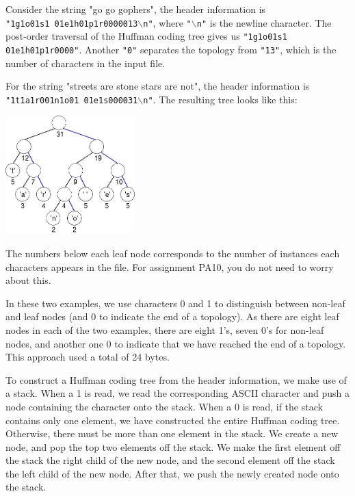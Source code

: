 \documentclass[11pt]{article}
\begin{document}
Consider the string "go go gophers", the header information is\\
\texttt{"1g1o01s1 01e1h01p1r0000013$\backslash$n"}, where
\texttt{"$\backslash$n"} is the newline character.  The post-order
traversal of the Huffman coding tree gives us \texttt{"1g1o01s1
  01e1h01p1r0000"}. Another \texttt{"0"} separates the topology from
\texttt{"13"}, which is the number of characters in the input file.
 
For the string "streets are stone stars are not", the header
information is\\ \texttt{"1t1a1r001n1o01 01e1s000031$\backslash$n"}.
The resulting tree looks like this:

\begin{center}
  \includegraphics[width=5cm]{figures/streetstar}
\end{center}

The numbers below each leaf node corresponds to the number of
instances each characters appears in the file.  For assignment PA10,
you do not need to worry about this.
 
In these two examples, we use characters 0 and 1 to distinguish
between non-leaf and leaf nodes (and 0 to indicate the end of a
topology).  As there are eight leaf nodes in each of the two examples,
there are eight 1's, seven 0's for non-leaf nodes, and another one 0
to indicate that we have reached the end of a topology.  This approach
used a total of 24 bytes.

To construct a Huffman coding tree from the header information, we
make use of a stack.  When a 1 is read, we read the corresponding
ASCII character and push a node containing the character onto the
stack.  When a 0 is read, if the stack contains only one element, we
have constructed the entire Huffman coding tree.  Otherwise, there
must be more than one element in the stack.  We create a new node, and
pop the top two elements off the stack.  We make the first element off
the stack the right child of the new node, and the second element off
the stack the left child of the new node.  After that, we push the
newly created node onto the stack.
   
\end{document}
